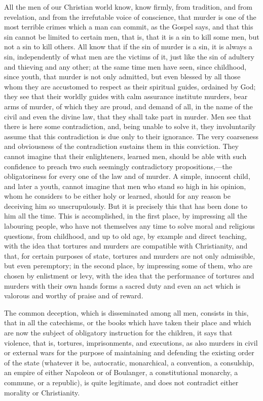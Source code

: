 \documentclass{book}
\begin{document}
All the men of our Christian world know, know firmly, from tradition, and from revelation, and from the irrefutable voice of conscience, that murder is one of the most terrible crimes which a man can commit, as the Gospel says, and that this sin cannot be limited to certain men, that is, that it is a sin to kill some men, but not a sin to kill others. All know that if the sin of murder is a sin, it is always a sin, independently of what men are the victims of it, just like the sin of adultery and thieving and any other; at the same time men have seen, since childhood, since youth, that murder is not only admitted, but even blessed by all those whom they are accustomed to respect as their spiritual guides, ordained by God; they see that their worldly guides with calm assurance institute murders, bear arms of murder, of which they are proud, and demand of all, in the name of the civil and even the divine law, that they shall take part in murder. Men see that there is here some contradiction, and, being unable to solve it, they involuntarily assume that this contradiction is due only to their ignorance. The very coarseness and obviousness of the contradiction sustains them in this conviction. They cannot imagine that their enlighteners, learned men, should be able with such confidence to preach two such seemingly contradictory propositions,—the obligatoriness for every one of the law and of murder. A simple, innocent child, and later a youth, cannot imagine that men who stand so high in his opinion, whom he considers to be either holy or learned, should for any reason be deceiving him so unscrupulously. But it is precisely this that has been done to him all the time. This is accomplished, in the first place, by impressing all the labouring people, who have not themselves any time to solve moral and religious questions, from childhood, and up to old age, by example and direct teaching, with the idea that tortures and murders are compatible with Christianity, and that, for certain purposes of state, tortures and murders are not only admissible, but even peremptory; in the second place, by impressing some of them, who are chosen by enlistment or levy, with the idea that the performance of tortures and murders with their own hands forms a sacred duty and even an act which is valorous and worthy of praise and of reward.

The common deception, which is disseminated among all men, consists in this, that in all the catechisms, or the books which have taken their place and which are now the subject of obligatory instruction for the children, it says that violence, that is, tortures, imprisonments, and executions, as also murders in civil or external wars for the purpose of maintaining and defending the existing order of the state (whatever it be, autocratic, monarchical, a convention, a consulship, an empire of either Napoleon or of Boulanger, a constitutional monarchy, a commune, or a republic), is quite legitimate, and does not contradict either morality or Christianity.
\end{document}
